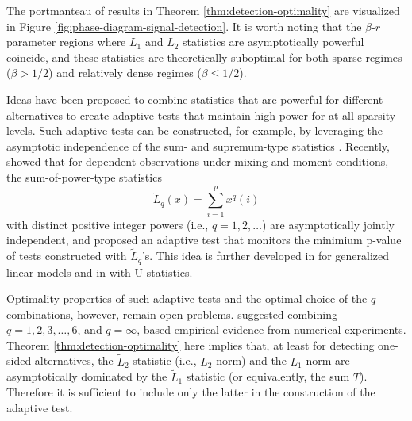 The portmanteau of results in Theorem \ref{thm:detection-optimality} are visualized in Figure \ref{fig:phase-diagram-signal-detection}.
It is worth noting that the $\beta$-$r$ parameter regions where $L_1$ and $L_2$ statistics are asymptotically powerful coincide, and 
these statistics are theoretically suboptimal for both sparse regimes ($\beta>1/2$) and relatively dense regimes ($\beta\le 1/2$).

Ideas have been proposed to combine statistics that are powerful for different alternatives to create adaptive tests that maintain high power 
for at all sparsity levels. Such adaptive tests can be constructed, for example, by leveraging the asymptotic independence of the sum- and supremum-type statistics \citep{hsing1995note}. 
Recently, \citet{xu2016adaptive} showed that for dependent observations under mixing and moment conditions, the sum-of-power-type statistics
\begin{equation}
    \widetilde{L}_q(x) = \sum_{i=1}^p x^q(i)
\end{equation} 
with distinct positive integer powers (i.e., $q=1,2,\ldots$) are asymptotically jointly independent, and proposed an adaptive test that monitors the minimium p-value of tests constructed with $\tilde{L}_q$'s.
This idea is further developed in \cite{wu2019adaptive} for generalized linear models and in \cite{he2018asymptotically} with U-statistics.

Optimality properties of such adaptive tests and the optimal choice of the $q$-combinations, however, remain open problems.
\cite{xu2016adaptive} suggested combining $q=1, 2, 3, \ldots, 6$, and  $q=\infty$, based empirical evidence from numerical experiments. 
Theorem \ref{thm:detection-optimality} here implies that, at least for detecting one-sided alternatives, the $\widetilde{L}_2$ statistic (i.e., $L_2$ norm) and the $L_1$ norm are asymptotically dominated by the $\widetilde{L}_1$ statistic (or equivalently, the sum $T$). Therefore it is sufficient to include only the latter in the construction of the adaptive test. 







